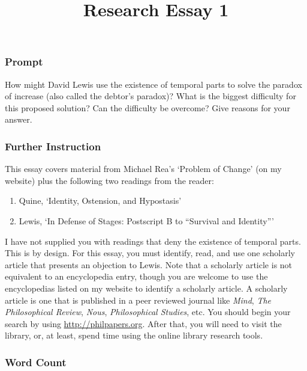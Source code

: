 \documentclass[10pt]{article}
\title{Research Essay 1}
\date{}
\begin{document}
\maketitle

\subsubsection{Prompt}\label{prompt}

How might David Lewis use the existence of temporal parts to solve the
paradox of increase (also called the debtor's paradox)? What is the
biggest difficulty for this proposed solution? Can the difficulty be
overcome? Give reasons for your answer.

\subsubsection{Further Instruction}\label{further-instruction}

This essay covers material from Michael Rea's `Problem of Change' (on my
website) plus the following two readings from the reader:

\begin{enumerate}
\def\labelenumi{\arabic{enumi}.}
\itemsep1pt\parskip0pt
\item
  Quine, `Identity, Ostension, and Hypostasis'
\item
  Lewis, `In Defense of Stages: Postscript B to ``Survival and
  Identity'''
\end{enumerate}

I have not supplied you with readings that deny the existence of
temporal parts. This is by design. For this essay, you must identify,
read, and use one scholarly article that presents an objection to Lewis.
Note that a scholarly article is not equivalent to an encyclopedia
entry, though you are welcome to use the encyclopedias listed on my
website to identify a scholarly article. A scholarly article is one that
is published in a peer reviewed journal like \emph{Mind}, \emph{The
Philosophical Review}, \emph{Nous}, \emph{Philosophical Studies}, etc.
You should begin your search by using \url{http://philpapers.org}. After
that, you will need to visit the library, or, at least, spend time using
the online library research tools.

\subsubsection{Word Count}\label{word-count}
\end{document}
